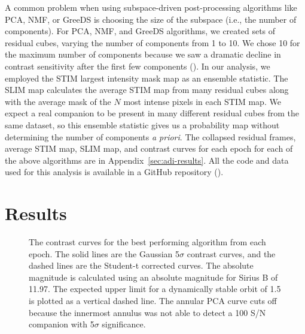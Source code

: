\documentclass[twocolumn]{aastex631}
\begin{document}
A common problem when using subspace-driven post-processing algorithms like PCA, NMF, or GreeDS is choosing the size of the subspace (i.e., the number of components). For PCA, NMF, and GreeDS algorithms, we created sets of residual cubes, varying the number of components from 1 to 10. We chose 10 for the maximum number of components because we saw a dramatic decline in contrast sensitivity after the first few components (). In our analysis, we employed the STIM largest intensity mask map \citep[SLIM map;][]{pairetSignalProcessingMethods2020} as an ensemble statistic. The SLIM map calculates the average STIM map from many residual cubes along with the average mask of the $N$ most intense pixels in each STIM map. We expect a real companion to be present in many different residual cubes from the same dataset, so this ensemble statistic gives us a probability map without determining the number of components \textit{a priori}. The collapsed residual frames, average STIM map, SLIM map, and contrast curves for each epoch for each of the above algorithms are in Appendix~\ref{sec:adi-results}. All the code and data used for this analysis is available in a GitHub repository ().


\section{Results}\label{sec:results}

\begin{figure*}
    \centering
    \caption{The contrast curves for the best performing algorithm from each epoch. The solid lines are the Gaussian 5$\sigma$ contrast curves, and the dashed lines are the Student-t corrected curves. The absolute magnitude is calculated using an absolute magnitude for Sirius B of 11.97. The expected upper limit for a dynamically stable orbit of \qty{1.5}{\au} is plotted as a vertical dashed line. The annular PCA curve cuts off because the innermost annulus was not able to detect a 100 S/N companion with 5$\sigma$ significance.}
    \label{fig:contrast}
\end{figure*}
\end{document}
